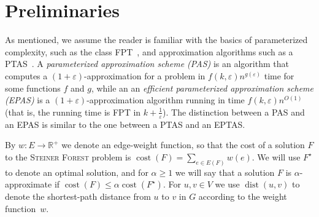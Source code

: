 \documentclass[a4paper]{article}
\theoremstyle{plain}
\newcommand{\eps}{{\varepsilon}}
\newcommand{\pname}[1]{\textsc{#1}}
\DeclareMathOperator{\cost}{cost}
\DeclareMathOperator{\dist}{dist}
\newcommand{\SF}{\pname{Steiner Forest}\xspace}
\begin{document}
\section{Preliminaries}\label{sec:prelims}

As mentioned, we assume the reader is familiar with the basics of parameterized
complexity, such as the class FPT~\cite{cygan2015parameterized}, and approximation algorithms
such as a PTAS~\cite{williamson2011design}. A
\emph{parameterized approximation scheme (PAS)} is an algorithm that computes a
$(1+\eps)$-approximation for a problem in  $f(k,\eps)n^{g(\eps)}$ time for some
functions $f$ and $g$, while an an \emph{efficient parameterized approximation
scheme (EPAS)} is a $(1+\eps)$-approximation algorithm running in time
$f(k,\eps)n^{O(1)}$ (that is, the running time is FPT in $k+\frac{1}{\eps}$).
The distinction between a PAS and an EPAS is similar to the one between a PTAS
and an EPTAS.

By $w:E\to\mathbb{R}^+$ we denote an edge-weight function, so that the cost of a solution $F$
to the \SF problem is $\cost(F)=\sum_{e\in E(F)} w(e)$. 
We will use $F^\star$ to denote an optimal solution, and for
$\alpha\ge 1$ we will say that a solution $F$ is $\alpha$-approximate if
$\cost(F)\le \alpha\cost(F^\star)$. For $u,v\in V$ we use $\dist(u,v)$ to
denote the shortest-path distance from $u$ to $v$ in $G$ according to the weight function~$w$.
\end{document}
